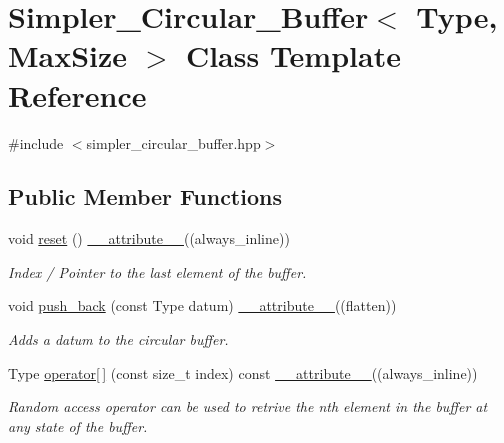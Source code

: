 \hypertarget{classSimpler__Circular__Buffer}{}\section{Simpler\+\_\+\+Circular\+\_\+\+Buffer$<$ Type, Max\+Size $>$ Class Template Reference}
\label{classSimpler__Circular__Buffer}


{\ttfamily \#include $<$simpler\+\_\+circular\+\_\+buffer.\+hpp$>$}

\subsection*{Public Member Functions}
\begin{DoxyCompactItemize}
\item 
void \hyperlink{classSimpler__Circular__Buffer_a793cdb8134afe48ef9918fa0428dfbb6}{reset} () \hyperlink{utilities_8hpp_a103d5b3998e0dd804213c8f30a094f4d}{\+\_\+\+\_\+attribute\+\_\+\+\_\+}((always\+\_\+inline))
\begin{DoxyCompactList}\small\item\em Index / Pointer to the last element of the buffer. \end{DoxyCompactList}\item 
void \hyperlink{classSimpler__Circular__Buffer_af4bdd0a6d3fc7a8c06f62b0d996158f0}{push\+\_\+back} (const Type datum) \hyperlink{utilities_8hpp_a103d5b3998e0dd804213c8f30a094f4d}{\+\_\+\+\_\+attribute\+\_\+\+\_\+}((flatten))
\begin{DoxyCompactList}\small\item\em Adds a datum to the circular buffer. \end{DoxyCompactList}\item 
Type \hyperlink{classSimpler__Circular__Buffer_a4ce53bc8ad0d231e9d013c771191696a}{operator\mbox{[}$\,$\mbox{]}} (const size\+\_\+t index) const \hyperlink{utilities_8hpp_a103d5b3998e0dd804213c8f30a094f4d}{\+\_\+\+\_\+attribute\+\_\+\+\_\+}((always\+\_\+inline))
\begin{DoxyCompactList}\small\item\em Random access operator can be used to retrive the nth element in the buffer at any state of the buffer. \end{DoxyCompactList}\end{DoxyCompactItemize}
